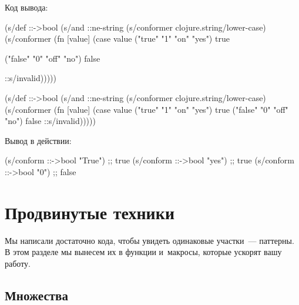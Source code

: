 \noindent
Код вывода:

\ifx\devicetype\mobile

\begin{english}
  \begin{clojure}
(s/def ::->bool
  (s/and
   ::ne-string
   (s/conformer
     clojure.string/lower-case)
   (s/conformer
    (fn [value]
      (case value
        ("true" "1" "on" "yes")
        true

        ("false" "0" "off" "no")
        false

        ::s/invalid)))))

  \end{clojure}
\end{english}

\else

\begin{english}
  \begin{clojure}
(s/def ::->bool
  (s/and
   ::ne-string
   (s/conformer clojure.string/lower-case)
   (s/conformer
    (fn [value]
      (case value
        ("true" "1" "on" "yes") true
        ("false" "0" "off" "no") false
        ::s/invalid)))))

  \end{clojure}
\end{english}

\fi

\noindent
Вывод в действии:

\begin{english}
  \begin{clojure}
(s/conform ::->bool "True") ;; true
(s/conform ::->bool "yes")  ;; true
(s/conform ::->bool "0")    ;; false
  \end{clojure}
\end{english}

\section{Продвинутые техники}


Мы написали достаточно кода, чтобы увидеть одинаковые участки~--- паттерны. В
этом разделе мы вынесем их в функции и~макросы, которые ускорят вашу работу.

\subsection{Множества}


